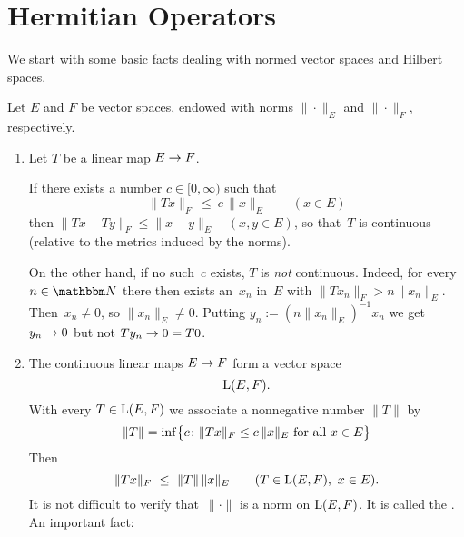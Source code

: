 \documentclass[main.tex]{subfiles}
\begin{document}
\section{Hermitian Operators}
We start with some basic facts dealing 
with normed vector spaces and Hilbert spaces.
%
%
\begin{psec}{5.1}%
Let $E$ and $F$ be vector spaces,
endowed with norms $\|\cdot\|_E$ and $\|\cdot\|_F$, respectively.
\begin{enumerate}
\item \label{5.1-1}
Let $T$ be a linear map $E\rightarrow F$.

If there exists a number $c\in [0,\infty)$ such that
\begin{equation*}
\|Tx\|_F \ \leq \ c\,\|x\|_E \qquad (x\in E)
\end{equation*}
then $\|Tx-Ty\|_F \leq \|x-y\|_E\quad (x,y\in E)$,
so that~$T$ is continuous
(relative to the metrics induced by the norms).

On the other hand,
if no such~$c$ exists,
$T$ is \emph{not} continuous.
Indeed,
for every $n\in\N$
there then exists an~$x_n$ in~$E$
with $\|T x_n\|_F > n \|x_n\|_E$.
Then~$x_n\neq 0$, so $\|x_n\|_E\neq 0$.
Putting $y_n:=(n\|x_n\|_E)^{-1}x_n$
we get $y_n\rightarrow 0$
but not $Ty_n\rightarrow 0=T0$.
%
\item \label{5.1-2}
The continuous linear maps $E\rightarrow F$ form a vector space
\begin{equation*}
\mathrm{L}(E,F)\text{.}
\end{equation*}
With every $T\in\mathrm{L}(E,F)$ 
we associate a nonnegative number $\| T \|$ by
\begin{equation*}
\|T\| = \inf \bigl\{ c\colon 
\|Tx\|_F \leq c\,\|x\|_E\text{ for all }x\in E\bigr\}
\end{equation*}
Then
\begin{equation*}
\|Tx\|_F\ \leq\ \|T\|\,\|x\|_E \qquad (T\in\mathrm{L}(E,F),\ x\in E)\text{.}
\end{equation*}
It is not difficult to verify
that~$\|\cdot\|$ is a norm on $\mathrm{L}(E,F)$.
It is called the .
An important fact:
\end{enumerate}
\end{psec}
%
%
\end{document}

